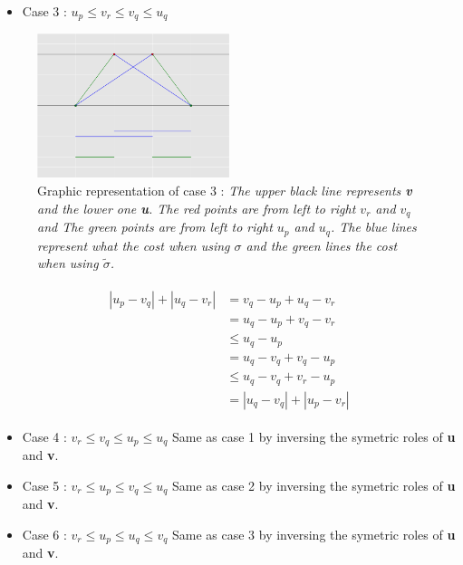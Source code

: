 \documentclass{article}
\begin{document}
\begin{itemize}
	\item Case 3 : $u_p\leq v_r \leq v_q \leq u_q$
	\end{itemize}
	
\begin{figure}
  
    \includegraphics[width=0.5\textwidth]{demo_sort3.png}
     \caption{Graphic representation of case 3 : \emph{The upper black line represents \textbf{v} and the lower one \textbf{u}. The red points are from left to right $v_r$ and $v_q$ and The green points are from left to right $u_p$ and $u_q$. The blue lines represent what the cost when using $\sigma$ and the green lines  the cost when using $\tilde{\sigma}$. } }
\end{figure}	
	
	\begin{multline*}
	\begin{split}
	|u_p-v_q| + |u_q-v_r|	&=  v_q-u_p+u_q-v_r\\
		&=  u_q-u_p+v_q-v_r \\
	 	&\leq u_q-u_p\\
	 	&= u_q-v_q+v_q-u_p\\
	 	&\leq u_q-v_q+v_r-u_p\\
	 	&= |u_q-v_q|+|u_p-v_r|
	\end{split}
	\end{multline*}
	
	
	\begin{itemize}
	\item Case 4 : $v_r\leq v_q \leq u_p \leq u_q$\newline
	Same as case 1 by inversing the symetric roles of \textbf{u} and \textbf{v}.
	
	\item Case 5 : $v_r\leq u_p \leq v_q \leq u_q$\newline
	Same as case 2 by inversing the symetric roles of \textbf{u} and \textbf{v}.
	
	\item Case 6 : $v_r\leq u_p \leq u_q \leq v_q$\newline
	Same as case 3 by inversing the symetric roles of \textbf{u} and \textbf{v}.
	\end{itemize}
\end{document}
